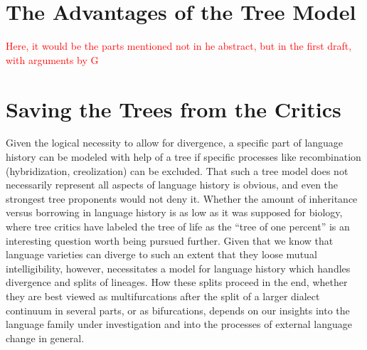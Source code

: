 \documentclass[svgnames,12pt]{scrartcl}
\newcommand\Comment[1]{\textcolor{red}{#1}}
\begin{document}
{{\section{The Advantages of the Tree Model}
\Comment{Here, it would be the parts mentioned not in he abstract, but in the first draft, with
arguments by G}

\section{Saving the Trees from the Critics}
Given the logical necessity to allow for divergence, a specific part of language history can be
modeled with help of a tree if specific processes like recombination (hybridization, creolization)
can be excluded. That such a tree model does not necessarily represent all aspects of language
history is obvious, and even the strongest tree proponents would not deny it. Whether the amount
of inheritance versus borrowing in language history is as low as it was supposed for biology, where
tree critics have labeled the tree of life as the ``tree of one percent'' \citep{Dagan2006} is an
interesting question worth being pursued further. Given that we know that language varieties can
diverge to such an extent that they loose mutual intelligibility, however, necessitates a model for
language history which handles divergence and splits of lineages. How these splits proceed in the
end, whether they are best viewed as multifurcations after the split of a larger dialect continuum
in several parts, or as bifurcations, depends on our insights into the language family under
investigation and into the processes of external language change in general. 
}}
\end{document}
